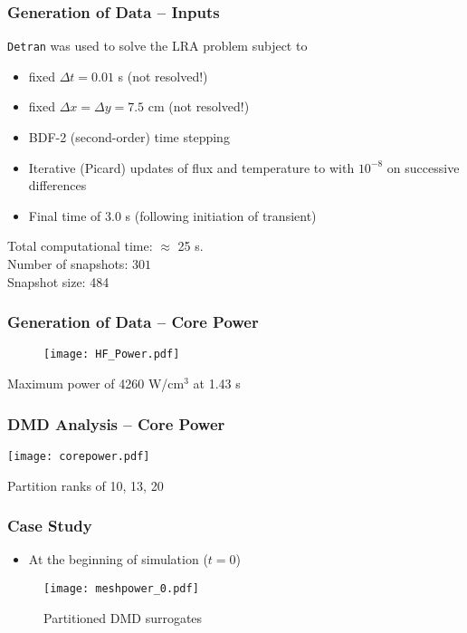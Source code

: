 \documentclass[fleqn]{beamer}
\begin{document}
\begin{frame}
\frametitle{Generation of Data -- Inputs}

{\tt Detran} was used to solve the LRA problem subject to
\begin{itemize}
  \item fixed $\Delta t = 0.01$ s (not resolved!)
  \item fixed $\Delta x = \Delta y = 7.5$ cm (not resolved!)
  \item BDF-2 (second-order) time stepping
  \item Iterative (Picard) updates of flux and temperature to with $10^{-8}$ on successive differences
  \item Final time of 3.0 s (following initiation of transient)
\end{itemize}
\vfill 
Total computational time: $\approx$ 25 s. \\
Number of snapshots: $301$\\
Snapshot size: 484
\vfill 

\end{frame}

\begin{frame}
\frametitle{Generation of Data -- Core Power}
\begin{figure}[ht]
\texttt{[image: HF\_Power.pdf]}
\end{figure}
Maximum power of 4260 W/cm$^3$ at 1.43 s
\end{frame}


\begin{frame}
\frametitle{DMD Analysis -- Core Power}

\texttt{[image: corepower.pdf]}

Partition ranks of 10, 13, 20
\end{frame}

\begin{frame}
\frametitle{Case Study}
\begin{itemize}
	\item At the beginning of simulation ($t=0$)
\end{itemize}
\begin{figure}
\texttt{[image: meshpower\_0.pdf]}
\caption{Partitioned DMD surrogates}
\end{figure}
\end{frame}
\end{document}
